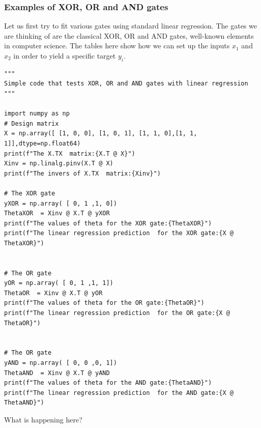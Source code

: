 \documentclass{beamer}
\begin{document}
\begin{frame}
\frametitle{Examples of XOR, OR and AND gates}

Let us first try to fit various gates using standard linear
regression. The gates we are thinking of are the classical XOR, OR and
AND gates, well-known elements in computer science. The tables here
show how we can set up the inputs $x_1$ and $x_2$ in order to yield a
specific target $y_i$.
































\begin{verbatim}
"""
Simple code that tests XOR, OR and AND gates with linear regression
"""

import numpy as np
# Design matrix
X = np.array([ [1, 0, 0], [1, 0, 1], [1, 1, 0],[1, 1, 1]],dtype=np.float64)
print(f"The X.TX  matrix:{X.T @ X}")
Xinv = np.linalg.pinv(X.T @ X)
print(f"The invers of X.TX  matrix:{Xinv}")

# The XOR gate 
yXOR = np.array( [ 0, 1 ,1, 0])
ThetaXOR  = Xinv @ X.T @ yXOR
print(f"The values of theta for the XOR gate:{ThetaXOR}")
print(f"The linear regression prediction  for the XOR gate:{X @ ThetaXOR}")


# The OR gate 
yOR = np.array( [ 0, 1 ,1, 1])
ThetaOR  = Xinv @ X.T @ yOR
print(f"The values of theta for the OR gate:{ThetaOR}")
print(f"The linear regression prediction  for the OR gate:{X @ ThetaOR}")


# The OR gate 
yAND = np.array( [ 0, 0 ,0, 1])
ThetaAND  = Xinv @ X.T @ yAND
print(f"The values of theta for the AND gate:{ThetaAND}")
print(f"The linear regression prediction  for the AND gate:{X @ ThetaAND}")

\end{verbatim}


What is happening here?
\end{frame}
\end{document}

